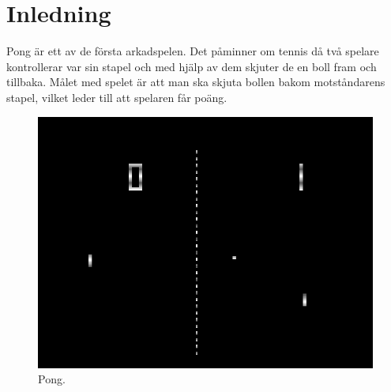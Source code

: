 \section{Inledning}
Pong är ett av de första arkadspelen. Det påminner om tennis då två spelare kontrollerar var sin stapel och med hjälp av dem skjuter de en boll fram och tillbaka. Målet med spelet är att man ska skjuta bollen bakom motståndarens stapel, vilket leder till att spelaren får poäng.
\begin{center}
\begin{figure}[H]
    \centering
\includegraphics[scale=0.30]{../grafik/Pong.png}
\caption{Pong.}
\label{fig:gui}
\end{figure}
\end{center}